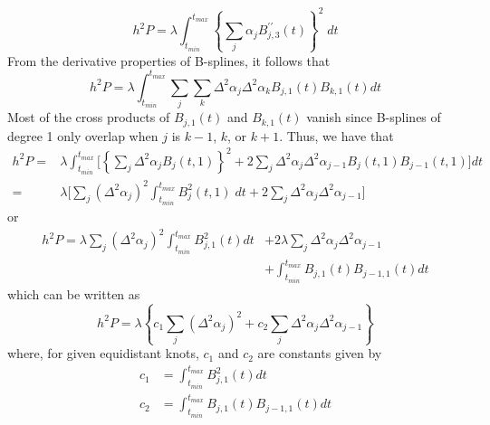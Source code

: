 \documentclass[12pt]{article}
\theoremstyle{definition}
\begin{document}
\begin{equation} \label{eq:osullivan_univariate_bspline_penalty}
h^2 P = \lambda \int_{t_{min}}^{t_{max}} \left\{ \sum_{j}  \alpha_j B_{j,3}^{\prime \prime} \left(t\right) \right\}^2\; dt
\end{equation}
\noindent
From the derivative properties of B-splines, it follows that
\begin{equation} \label{osullivan_univariate_bspline_penalty_via_deriv}
h^2 P = \lambda \int_{t_{min}}^{t_{max}}  \sum_{j} \sum_{k} \Delta^2 \alpha_j \Delta^2 \alpha_k B_{j,1}\left(t\right)B_{k,1}\left(t\right) dt 
\end{equation}
\noindent
Most of the cross products of $B_{j,1}(t)$ and $B_{k,1}(t)$ vanish since B-splines of degree 1 only overlap when $j$ is $k-1$, $k$, or $k+1$. Thus, we have that
\begin{align}
h^2 P = {} & \lambda \int_{t_{min}}^{t_{max}} \bigg[ \left\{ \sum_{j}  \Delta^2 \alpha_j  B_j\left(t,1\right)  \right\}^2  + 2 \sum_{j}\Delta^2 \alpha_j\Delta^2 \alpha_{j-1}B_j\left(t,1\right)B_{j-1}\left(t,1\right) \bigg] dt \nonumber \\ 
= {} & \lambda \bigg[ \sum_j \left( \Delta^2\alpha_j \right)^2 \int_{t_{min}}^{t_{max}} B_j^2\left(t,1\right)\;dt + 2 \sum_j \Delta^2 \alpha_j\Delta^2 \alpha_{j-1} \bigg]
\end{align}
\noindent
or
\begin{align}
h^2 P = \lambda \sum_j \left( \Delta^2\alpha_j \right)^2 \int_{t_{min}}^{t_{max}} B_{j,1}^2\left(t\right) dt {} & +  2\lambda \sum_j \Delta^2 \alpha_j \Delta^2 \alpha_{j-1}  \nonumber \\ 
{} &+\int_{t_{min}}^{t_{max}} B_{j,1}\left(t\right)B_{j-1,1}\left(t\right) dt
\end{align}
\noindent
which can be written as
\begin{equation} \label{eq:osullivan_penalty_decomp}
h^2 P = \lambda\left\{c_1 \sum_j\left( \Delta^2 \alpha_j\right)^2 + c_2 \sum_j\Delta^2 \alpha_j\Delta^2 \alpha_{j-1} \right\}
\end{equation}
\noindent
where, for given equidistant knots, $c_1$ and $c_2$ are constants given by
\begin{equation}
\begin{split}
c_1 & =   \int_{t_{min}}^{t_{max}} B_{j,1}^2\left(t\right) dt\\
c_2 & = \int_{t_{min}}^{t_{max}} B_{j,1}\left(t\right)B_{j-1,1}\left(t\right) dt
\end{split}
\end{equation}
\end{document}
